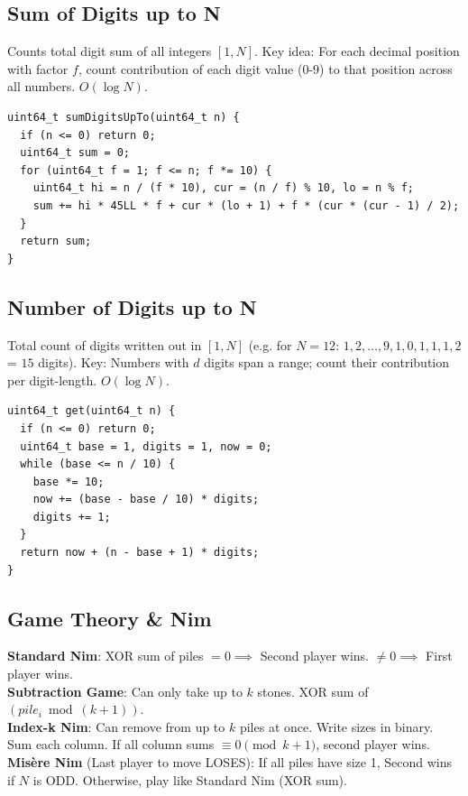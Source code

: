 \subsection{Sum of Digits up to N}
Counts total digit sum of all integers $[1, N]$.
Key idea: For each decimal position with factor $f$, count contribution of each digit value (0-9) to that position across all numbers. $O(\log N)$.
\begin{verbatim}
uint64_t sumDigitsUpTo(uint64_t n) {
  if (n <= 0) return 0;
  uint64_t sum = 0;
  for (uint64_t f = 1; f <= n; f *= 10) {
    uint64_t hi = n / (f * 10), cur = (n / f) % 10, lo = n % f;
    sum += hi * 45LL * f + cur * (lo + 1) + f * (cur * (cur - 1) / 2);
  }
  return sum;
}
\end{verbatim}
\subsection{Number of Digits up to N}
Total count of digits written out in $[1, N]$ (e.g. for $N=12$: $1,2,\dots,9,1,0,1,1,1,2$ = $15$ digits).
Key: Numbers with $d$ digits span a range; count their contribution per digit-length. $O(\log N)$.
\begin{verbatim}
uint64_t get(uint64_t n) {
  if (n <= 0) return 0;
  uint64_t base = 1, digits = 1, now = 0;
  while (base <= n / 10) {
    base *= 10;
    now += (base - base / 10) * digits;
    digits += 1;
  }
  return now + (n - base + 1) * digits;
}
\end{verbatim}
\subsection{Game Theory \texorpdfstring{\&}{&} Nim}
\textbf{Standard Nim}: XOR sum of piles $= 0 \implies$ Second player wins. $\neq 0 \implies$ First player wins. \\
\textbf{Subtraction Game}: Can only take up to $k$ stones. XOR sum of $(pile_i \bmod (k+1))$. \\
\textbf{Index-k Nim}: Can remove from up to $k$ piles at once. Write sizes in binary. Sum each column. If all column sums $\equiv 0 \pmod{k+1}$, second player wins. \\
\textbf{Mis\`{e}re Nim} (Last player to move LOSES): If all piles have size 1, Second wins if $N$ is ODD. Otherwise, play like Standard Nim (XOR sum).

